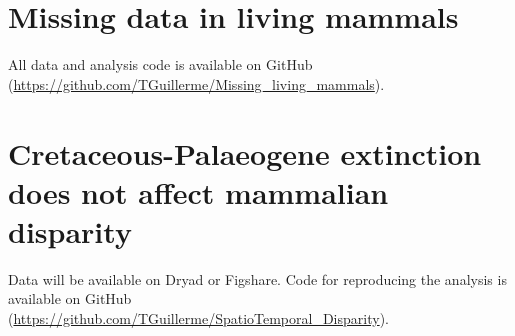 \documentclass[12pt]{mythesis} %
\begin{document}
\section*{Missing data in living mammals}
All data and analysis code is available on GitHub (\url{https://github.com/TGuillerme/Missing_living_mammals}).

\section*{Cretaceous-Palaeogene extinction does not affect mammalian disparity}
Data will be available on Dryad or Figshare.
Code for reproducing the analysis is available on GitHub (\url{https://github.com/TGuillerme/SpatioTemporal_Disparity}).


\newpage

\mainbody

 

   
	



\formatbibliography 
 


\formatappendices



\end{document}
